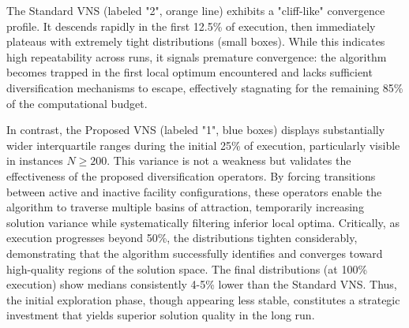 \documentclass[preprint,12pt,authoryear]{elsarticle}
\begin{document}
The Standard VNS (labeled "2", orange line) exhibits a "cliff-like" convergence profile. It descends rapidly in the first 12.5\% of execution, then immediately plateaus 
with extremely tight distributions (small boxes). While this indicates high repeatability across runs, it signals premature convergence: the algorithm becomes trapped 
in the first local optimum encountered and lacks sufficient diversification mechanisms to escape, effectively stagnating for the remaining 85\% of the computational budget.

In contrast, the Proposed VNS (labeled "1", blue boxes) displays substantially wider interquartile ranges during the initial 25\% of execution, particularly visible 
in instances $N \ge 200$. This variance is not a weakness but validates the effectiveness of the proposed diversification operators. 
By forcing transitions between active and inactive facility configurations, these operators enable the algorithm to traverse multiple basins of attraction, temporarily 
increasing solution variance while systematically filtering inferior local optima. Critically, as execution progresses beyond 50\%, the distributions tighten considerably, 
demonstrating that the algorithm successfully identifies and converges toward high-quality regions of the solution space. The final distributions (at 100\% execution) show 
medians consistently 4-5\% lower than the Standard VNS. Thus, the initial exploration phase, though appearing less stable, constitutes a strategic investment that yields 
superior solution quality in the long run.
\end{document}
